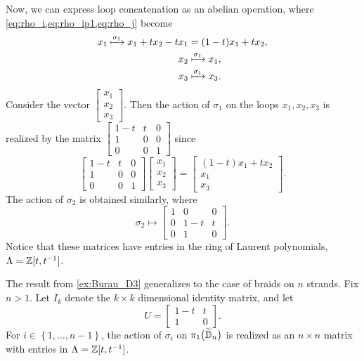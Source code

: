 \begin{example}
    Now, we can express loop concatenation as an abelian operation, where \cref{eq:rho_i,eq:rho_ip1,eq:rho_j} become
    \begin{align}
        x_1 \xmapsto{\sigma_1} x_1 + tx_2 - tx_1 &= (1-t)x_1 + tx_2, \\
        x_{2} &\xmapsto{\sigma_1} x_1, \\
        x_3 &\xmapsto{\sigma_1} x_3.
    \end{align}
    Consider the vector $\begin{bmatrix}
        x_1 \\ x_2 \\ x_3
    \end{bmatrix}$. Then the action of $\sigma_1$ on the loops $x_1,x_2,x_3$ is realized by the matrix $\begin{bmatrix}
        1-t & t & 0 \\ 1 & 0 & 0 \\ 0 & 0 & 1
    \end{bmatrix}$ since
    \begin{equation}
        \begin{bmatrix}
            1-t & t & 0 \\ 1 & 0 & 0 \\ 0 & 0 & 1
        \end{bmatrix}\begin{bmatrix}
            x_1 \\ x_2 \\ x_3
        \end{bmatrix} = \begin{bmatrix}
            (1-t)x_1 + tx_2 \\ x_1 \\ x_3
        \end{bmatrix}.
    \end{equation}
    The action of $\sigma_2$ is obtained similarly, where
    \begin{equation}
        \sigma_2 \mapsto \begin{bmatrix}
            1 & 0 & 0 \\ 0 & 1-t & t \\ 0 & 1 & 0
        \end{bmatrix}.
    \end{equation}
    Notice that these matrices have entries in the ring of Laurent polynomials, $\Lambda=\mathbb{Z}[t,{ t }^{-1}]$.
\end{example}

The result from \cref{ex:Burau_D3} generalizes to the case of braids on $n$ strands. Fix $n>1$. Let $I_k$ denote the $k\times k$ dimensional identity matrix, and let
\begin{equation}
    U=\begin{bmatrix}
        1-t & t \\ 1 & 0
    \end{bmatrix}.
\end{equation} 
For $i\in\left\{ 1,\dots,n-1 \right\}$, the action of $\sigma_i$ on $\pi_1\bigl( \widetilde{\mathbb{D}}_n \bigr)$ is realized as an $n\times n$ matrix with entries in $\Lambda = \mathbb{Z}[t,{ t }^{-1}]$. 

